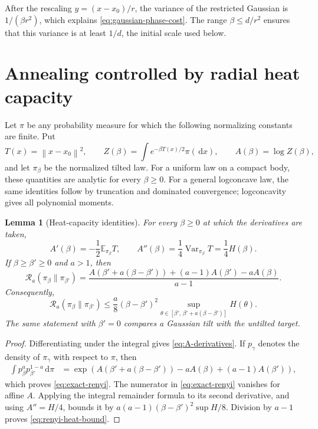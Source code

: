 \documentclass[11pt]{article}
\newtheorem{lemma}[theorem]{Lemma}
\theoremstyle{remark}
\newcommand{\E}{\mathbb E}
\newcommand{\1}{\bm 1}
\newcommand{\Var}{\operatorname{Var}}
\newcommand{\dd}{\,\mathrm d}
\newcommand{\norm}[1]{\left\lVert #1\right\rVert}
\begin{document}
After the rescaling $y=(x-x_0)/r$, the variance of the restricted
Gaussian is $1/(\beta r^2)$, which explains
\eqref{eq:gaussian-phase-cost}.  The range
$\beta\leq d/r^2$ ensures that this variance is at least $1/d$, the
initial scale used below.

\section{Annealing controlled by radial heat capacity}
\label{sec:annealing}

Let $\pi$ be any probability measure for which the following
normalizing constants are finite.  Put
\[
  T(x)=\norm{x-x_0}^2,
  \qquad
  Z(\beta)=\int e^{-\beta T(x)/2}\pi(\dd x),
  \qquad
  A(\beta)=\log Z(\beta),
\]
and let $\pi_\beta$ be the normalized tilted law.  For a uniform law on
a compact body, these quantities are analytic for every
$\beta\geq0$.  For a general logconcave law, the same identities follow
by truncation and dominated convergence; logconcavity gives all
polynomial moments.

\begin{lemma}[Heat-capacity identities]
\label{lem:partition-identities}
For every $\beta\geq0$ at which the derivatives are taken,
\begin{equation}\label{eq:A-derivatives}
  A'(\beta)=-\frac12\E_{\pi_\beta}T,
  \qquad
  A''(\beta)=\frac14\Var_{\pi_\beta}T=\frac14H(\beta).
\end{equation}
If $\beta\geq\beta'\geq0$ and $a>1$, then
\begin{equation}\label{eq:exact-renyi}
  \mathcal R_a(\pi_\beta\|\pi_{\beta'})
  =\frac{
    A(\beta'+a(\beta-\beta'))+(a-1)A(\beta')-aA(\beta)
  }{a-1}.
\end{equation}
Consequently,
\begin{equation}\label{eq:renyi-heat-bound}
  \mathcal R_a(\pi_\beta\|\pi_{\beta'})
  \leq\frac a8(\beta-\beta')^2
  \sup_{\theta\in[\beta',\,\beta'+a(\beta-\beta')]}H(\theta).
\end{equation}
The same statement with $\beta'=0$ compares a Gaussian tilt with the
untilted target.
\end{lemma}

\begin{proof}
Differentiating under the integral gives
\eqref{eq:A-derivatives}.  If $p_\gamma$ denotes the density of
$\pi_\gamma$ with respect to $\pi$, then
\begin{align*}
 \int p_\beta^a p_{\beta'}^{1-a}\dd\pi
 &=\exp\!\left(
 A(\beta'+a(\beta-\beta'))-aA(\beta)+(a-1)A(\beta')
 \right),
\end{align*}
which proves \eqref{eq:exact-renyi}.  The numerator in
\eqref{eq:exact-renyi} vanishes for affine $A$.  Applying the integral
remainder formula to its second derivative, and using
$A''=H/4$, bounds it by
$a(a-1)(\beta-\beta')^2\sup H/8$.  Division by $a-1$ proves
\eqref{eq:renyi-heat-bound}.
\end{proof}
\end{document}
